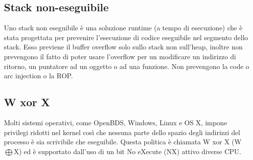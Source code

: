 \subsection{Stack non-eseguibile}
Uno stack non eseguibile è una soluzione runtime (a tempo di esecuzione) che è stata progettata per prevenire l'esecuzione di codice eseguibile  nel segmento dello stack. Esso previene il buffer overflow solo sullo stack non sull'heap, inoltre non prevengono il fatto di poter usare l'overflow per un modificare un indirizzo di ritorno, un puntatore ad un oggetto o ad una funzione. Non prevengono la code o arc injection o la ROP.

\subsection{W xor X}
Molti sistemi operativi, come OpenBDS, Windows, Linux e OS X, impone privilegi ridotti nel kernel così
che nessuna parte dello spazio degli indirizzi del processo è sia scrivibile che eseguibile. 
Questa politica è chiamata W xor X (W$\bigoplus$X) ed è supportato dall'uso di un bit No eXecute (NX) attivo diverse CPU.
